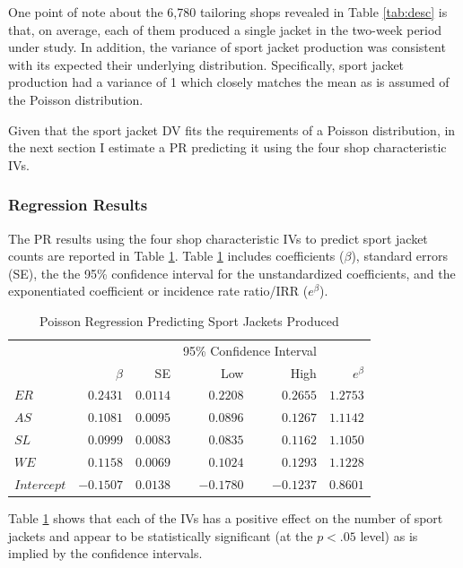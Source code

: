 \documentclass[ShortAfour,times,sageapa]{sagej}
\begin{document}
	One point of note about the 6,780 tailoring shops revealed in Table \ref{tab:desc} is that, on average, each of them produced a single jacket in the two-week period under study.
	In addition, the variance of sport jacket production was consistent with its expected their underlying distribution.
	Specifically, sport jacket production had a variance of 1 which closely matches the mean as is assumed of the Poisson distribution. 
	
	Given that the sport jacket DV fits the requirements of a Poisson distribution, in the next section I estimate a PR predicting it using the four shop characteristic IVs.

		\subsubsection{Regression Results}
		
	The PR results using the four shop characteristic IVs to predict sport jacket counts are reported in Table \ref{tab:poisreg}. 
	Table \ref{tab:poisreg} includes coefficients ($\beta$), standard errors (SE), the the 95\% confidence interval for the unstandardized coefficients, and the exponentiated coefficient or incidence rate ratio/IRR ($e^{\beta}$).
	
	\begin{table}[h!]
		\centering
		\caption{\centering Poisson Regression Predicting Sport Jackets Produced} 
		\begin{tabular}{l|rrrrr}
			\toprule
			\multicolumn{1}{l}{} &  &  & \multicolumn{2}{c}{95\% Confidence Interval} &   \\ 
			\cmidrule(lr){4-5}
			\multicolumn{1}{l}{} & $\beta$ & SE & Low & High & $e^{\beta}$ \\ 
			\midrule
			$ER$ & $0.2431$ & $0.0114$ & $0.2208$ & $0.2655$ & $1.2753$ \\  
			$AS$ & $0.1081$ & $0.0095$ & $0.0896$ & $0.1267$ & $1.1142$ \\ 
			$SL$ & $0.0999$ & $0.0083$ & $0.0835$ & $0.1162$ & $1.1050$ \\
			$WE$ & $0.1158$ & $0.0069$ & $0.1024$ & $0.1293$ & $1.1228$ \\ 
			$Intercept$ & $-0.1507$ & $0.0138$ & $-0.1780$ & $-0.1237$ & $0.8601$ \\
			\bottomrule
		\end{tabular}
		\label{tab:poisreg}
	\end{table}

	Table \ref{tab:poisreg} shows that each of the IVs has a positive effect on the number of sport jackets and appear to be statistically significant (at the $p < .05$ level) as is implied by the confidence intervals.
	
\end{document}
